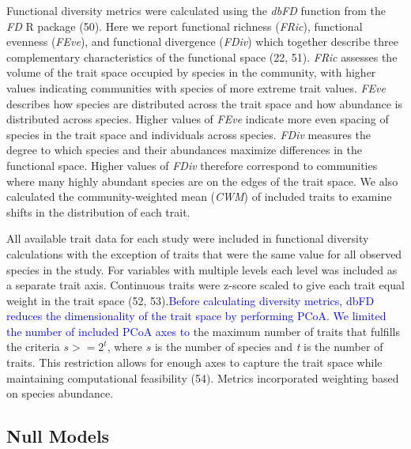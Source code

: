 \documentclass{article}
\begin{document}
Functional diversity metrics were calculated using the \emph{dbFD}
function from the \emph{FD} R package (50). Here we report functional
richness (\emph{FRic}), functional evenness (\emph{FEve}), and
functional divergence (\emph{FDiv}) which together describe three
complementary characteristics of the functional space (22, 51).
\emph{FRic} assesses the volume of the trait space occupied by species
in the community, with higher values indicating communities with species
of more extreme trait values. \emph{FEve} describes how species are
distributed across the trait space and how abundance is distributed
across species. Higher values of \emph{FEve} indicate more even spacing
of species in the trait space and individuals across species.
\emph{FDiv} measures the degree to which species and their abundances
maximize differences in the functional space. Higher values of
\emph{FDiv} therefore correspond to communities where many highly
abundant species are on the edges of the trait space. We also calculated
the community-weighted mean (\emph{CWM}) of included traits to examine
shifts in the distribution of each trait.

All available trait data for each study were included in functional
diversity calculations with the exception of traits that were the same
value for all observed species in the study. For variables with multiple
levels each level was included as a separate trait axis. Continuous
traits were z-score scaled to give each trait equal weight in the trait
space (52,
53).\textcolor{blue}{Before calculating diversity metrics, dbFD reduces the dimensionality of the trait space by performing PCoA. We limited the number of included PCoA axes to}
the maximum number of traits that fulfills the criteria \(s >= 2^t\),
where \(s\) is the number of species and \emph{t} is the number of
traits. This restriction allows for enough axes to capture the trait
space while maintaining computational feasibility (54). Metrics
incorporated weighting based on species abundance.

\hypertarget{null-models}{%
\subsection{Null Models}\label{null-models}}
\end{document}
